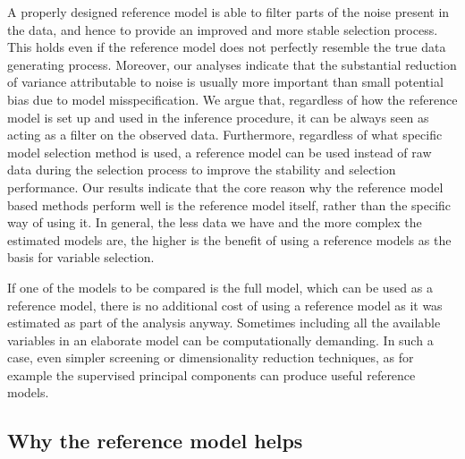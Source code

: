 \documentclass[a4]{article}
\theoremstyle{definition}
\begin{document}
A properly designed reference model is able to filter parts of the
noise present in the data, and hence to provide an improved and more
stable selection process. This holds even if the reference model does
not perfectly resemble the true data generating process. Moreover, our
analyses indicate that the substantial reduction of variance
attributable to noise is usually more important than small potential
bias due to model misspecification.  We argue that, regardless of how
the reference model is set up and used in the inference procedure, it
can be always seen as acting as a filter on the observed
data. Furthermore, regardless of what specific model selection method
is used, a reference model can be used instead of raw data during the
selection process to improve the stability and selection
performance. Our results indicate that the core reason why the
reference model based methods perform well is the reference model
itself, rather than the specific way of using it.  In general, the
less data we have and the more complex the estimated models are, the
higher is the benefit of using a reference models as the basis for
variable selection.

If one of the models to be compared is the full model, which can be
used as a reference model, there is no additional cost of using a
reference model as it was estimated as part of the analysis anyway.
Sometimes including all the available variables in an
elaborate model can be computationally demanding.  In such a
case, even simpler screening or dimensionality reduction techniques,
as for example the supervised principal components
\citep{bair2006prediction,piironen2018} can produce useful reference
models.


\hypertarget{reference-model-approach}{%
\subsection{Why the reference model helps}\label{reference-model-approach}}
 
\end{document}
